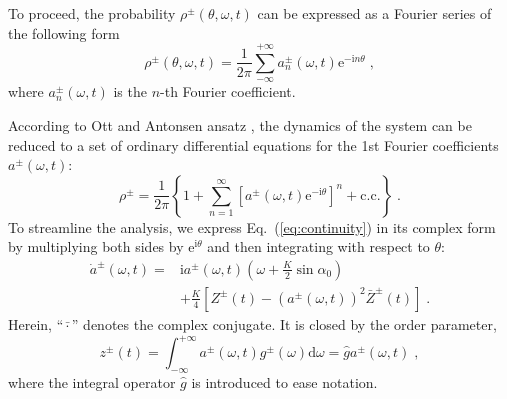 \documentclass{article}
\begin{document}
To proceed, the probability $\rho ^{\pm}\left( \theta ,\omega ,t \right)$ can be expressed as a Fourier series of the following form
\begin{equation}
    \rho ^{\pm}\left( \theta ,\omega ,t \right) =\frac{1}{2\pi}\sum_{-\infty}^{+\infty}{a^{\pm} _n\left( \omega ,t \right) \mathrm{e}^{-\mathrm{i}n\theta}}\;,
\end{equation}
where $a^{\pm} _n\left( \omega ,t \right)$ is the $n$-th Fourier coefficient.

According to Ott and Antonsen ansatz \cite{10.1063/1.2930766, 10.1063/1.3136851}, the dynamics of the system can be reduced to a set of ordinary differential equations for the 1st Fourier coefficients $a^{\pm}\left( \omega ,t \right)$:
\begin{equation}
    \rho ^{\pm}=\frac{1}{2\pi}\left\{ 1+\sum_{n=1}^{\infty}{\left[ a^{\pm} \left( \omega ,t \right) \mathrm{e}^{-\mathrm{i}\theta} \right] ^n+\mathrm{c}.\mathrm{c}.} \right\} \;.
\end{equation}
To streamline the analysis, we express Eq.~(\ref{eq:continuity}) in its complex form by multiplying both sides by $\mathrm{e}^{\mathrm{i}\theta}$ and then integrating with respect to $\theta$:
\begin{equation}
    \label{eq:aDynamics}
    \begin{aligned}
        \dot{a}^{\pm}\left( \omega ,t \right) =&\mathrm{i}a^{\pm}\left( \omega ,t \right) \left( \omega +\frac{K}{2}\sin \alpha _0 \right)\\
        &+\frac{K}{4}\left[ Z^{\pm}\left( t \right) -\left( a^{\pm}\left( \omega ,t \right) \right) ^2\bar{Z}^{\pm}\left( t \right) \right] \;.
    \end{aligned}
\end{equation}
Herein, \enquote{$\bar{\cdot}$} denotes the complex conjugate.
It is closed by the order parameter,
\begin{equation}
    \label{eq:zEqs2a}
    z^{\pm}\left( t \right) =\int_{-\infty}^{+\infty}{a^{\pm}\left( \omega ,t \right) g^{\pm}\left( \omega \right) \mathrm{d}\omega =}\hat{g}a^{\pm} \left( \omega ,t \right)\;,
\end{equation}
where the integral operator $\hat{g}$ is introduced to ease notation.
\end{document}
